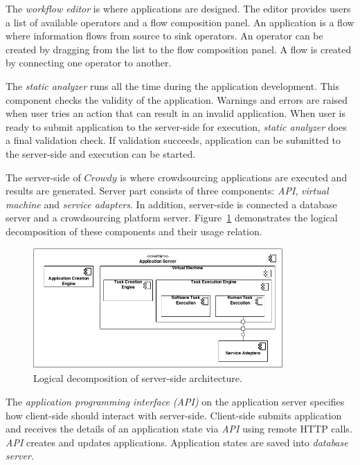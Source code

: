 The \textit{workflow editor} is where applications are designed. The editor provides 
users a list of available operators and a flow composition panel. An application is 
a flow where information flows from source to sink operators. An operator can be 
created by dragging from the list to the flow composition panel. A flow is created by 
connecting one operator to another.

The \textit{static analyzer} runs all the time during the application development. This 
component checks the validity of the application. Warnings and errors are raised 
when user tries an action that can result in an invalid application. When user is 
ready to submit application to the server-side for execution, \textit{static analyzer} 
does a final validation check. If validation succeeds, application can be submitted 
to the server-side and execution can be started.

The server-side of $Crowdy$ is where crowdsourcing applications are executed and 
results are generated. Server part consists of three components: \textit{API}, 
\textit{virtual machine} and \textit{service adapters}. In addition, server-side 
is connected a database server and a crowdsourcing platform server. 
Figure~\ref{fig:serverdecomposition} demonstrates the logical decomposition of these 
components and their usage relation.

\begin{figure}[ht]
	\centering
	\includegraphics[width=0.85\textwidth]{figures/architecture/CC3.png}
	\caption{Logical decomposition of server-side architecture.}
	\label{fig:serverdecomposition}
\end{figure}

The \textit{application programming interface (API)} on the application server 
specifies how client-side should interact with server-side. Client-side submits 
application and receives the details of an application state via \textit{API} using 
remote HTTP calls. \textit{API} creates and updates applications. Application 
states are saved into \textit{database server}.

